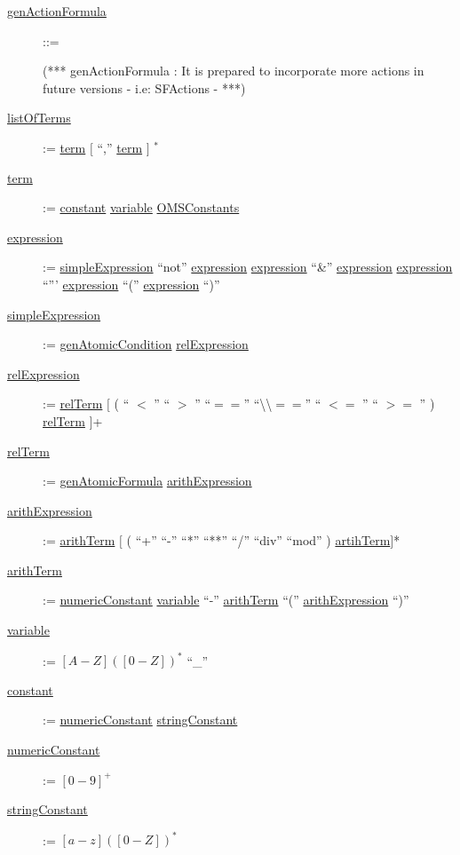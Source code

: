 \begin{description}
\item[\underline{genActionFormula}] ::= 

(*** genActionFormula : It is prepared to incorporate more actions in future versions - i.e: SFActions - ***)


\item[\underline{listOfTerms}] := \underline{term} $[$ ``,'' \underline{term} $]$ $^{*}$

\item[\underline{term}] := \underline{constant}  \textbar \underline{variable} \textbar \underline{OMSConstants}

\item[\underline{expression}] := \underline{simpleExpression} \textbar ``not'' \underline{expression} \textbar \underline{expression} ``\&'' \underline{expression} \textbar \underline{expression} ``\textbar''' \underline{expression} \textbar ``('' \underline{expression} ``)''

\item[\underline{simpleExpression}] := \underline{genAtomicCondition} \textbar \underline{relExpression}    

\item[\underline{relExpression}] := \underline{relTerm} $[$ ( `` $<$ '' \textbar `` $>$ '' \textbar ``$==$'' \textbar ``\textbackslash\textbackslash$==$'' `` $<=$ '' \textbar `` $>=$ '' ) \underline{relTerm} $]$+

\item[\underline{relTerm}] := \underline{genAtomicFormula} \textbar \underline{arithExpression}


\item[\underline{arithExpression}] := \underline{arithTerm} $[$ ( ``+''  \textbar  ``-''  \textbar  ``*''  \textbar  ``**''  \textbar ``/'' \textbar ``div'' \textbar ``mod'' ) \underline{artihTerm}$]$*

\item[\underline{arithTerm}] := \underline{numericConstant} \textbar \underline{variable} \textbar ``-'' \underline{arithTerm} \textbar ``('' \underline{arithExpression} ``)''

\item[\underline{variable}] := $\left[A-Z\right] (\left[0-Z\right])^{*}$ \textbar ``\_''
\item[\underline{constant}] := \underline{numericConstant} \textbar \underline{stringConstant} 
\item[\underline{numericConstant}] := $\left[0-9\right]^{+}$
\item[\underline{stringConstant}] := $\left[a-z\right] (\left[0-Z\right])^{*}$


\end{description}
